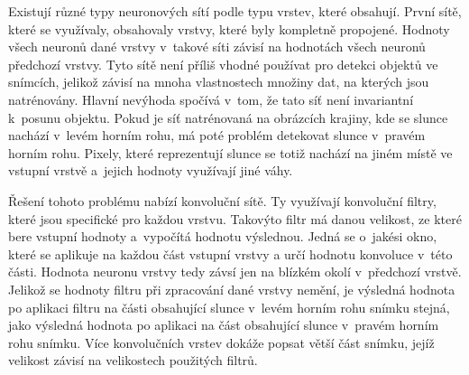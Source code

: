 Existují různé typy neuronových sítí podle typu vrstev, které obsahují. První sítě, které se využívaly, obsahovaly vrstvy, které byly kompletně propojené. Hodnoty všech neuronů dané vrstvy v~takové síti závisí na hodnotách všech neuronů předchozí vrstvy. Tyto sítě není příliš vhodné používat pro detekci objektů ve snímcích, jelikož závisí na mnoha vlastnostech množiny dat, na kterých jsou natrénovány. Hlavní nevýhoda spočívá v~tom, že tato síť není invariantní k~posunu objektu. Pokud je síť natrénovaná na obrázcích krajiny, kde se slunce nachází v~levém horním rohu, má poté problém detekovat slunce v~pravém horním rohu. Pixely, které reprezentují slunce se totiž nachází na jiném místě ve vstupní vrstvě a~jejich hodnoty využívají jiné váhy.

Řešení tohoto problému nabízí konvoluční sítě. Ty využívají konvoluční filtry, které jsou specifické pro každou vrstvu. Takovýto filtr má danou velikost, ze které bere vstupní hodnoty a~vypočítá hodnotu výslednou. Jedná se o~jakési okno, které se aplikuje na každou část vstupní vrstvy a určí hodnotu konvoluce v~této části. Hodnota neuronu vrstvy tedy závsí jen na blízkém okolí v~předchozí vrstvě. Jelikož se hodnoty filtru při zpracování dané vrstvy nemění, je výsledná hodnota po aplikaci filtru na části obsahující slunce v~levém horním rohu snímku stejná, jako výsledná hodnota po aplikaci na část obsahující slunce v~pravém horním rohu snímku. Více konvolučních vrstev dokáže popsat větší část snímku, jejíž velikost závisí na velikostech použitých filtrů.







































